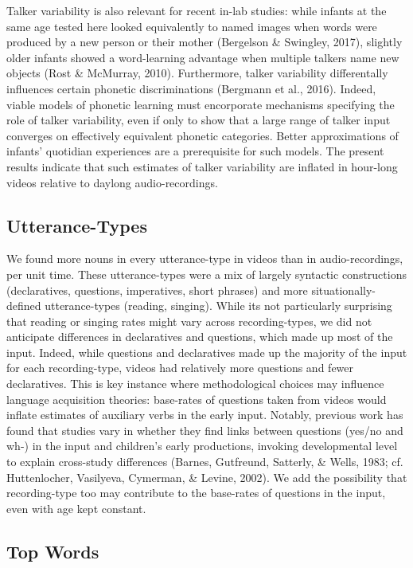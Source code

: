 \documentclass[man]{apa6}
\theoremstyle{definition}
\theoremstyle{definition}
\theoremstyle{definition}
\theoremstyle{remark}
\begin{document}
Talker variability is also relevant for recent in-lab studies: while
infants at the same age tested here looked equivalently to named images
when words were produced by a new person or their mother (Bergelson \&
Swingley, 2017), slightly older infants showed a word-learning advantage
when multiple talkers name new objects (Rost \& McMurray, 2010).
Furthermore, talker variability differentally influences certain
phonetic discriminations (Bergmann et al., 2016). Indeed, viable models
of phonetic learning must encorporate mechanisms specifying the role of
talker variability, even if only to show that a large range of talker
input converges on effectively equivalent phonetic categories. Better
approximations of infants' quotidian experiences are a prerequisite for
such models. The present results indicate that such estimates of talker
variability are inflated in hour-long videos relative to daylong
audio-recordings.

\subsection{Utterance-Types}\label{utterance-types}

We found more nouns in every utterance-type in videos than in
audio-recordings, per unit time. These utterance-types were a mix of
largely syntactic constructions (declaratives, questions, imperatives,
short phrases) and more situationally-defined utterance-types (reading,
singing). While its not particularly surprising that reading or singing
rates might vary across recording-types, we did not anticipate
differences in declaratives and questions, which made up most of the
input. Indeed, while questions and declaratives made up the majority of
the input for each recording-type, videos had relatively more questions
and fewer declaratives. This is key instance where methodological
choices may influence language acquisition theories: base-rates of
questions taken from videos would inflate estimates of auxiliary verbs
in the early input. Notably, previous work has found that studies vary
in whether they find links between questions (yes/no and wh-) in the
input and children's early productions, invoking developmental level to
explain cross-study differences (Barnes, Gutfreund, Satterly, \& Wells,
1983; cf. Huttenlocher, Vasilyeva, Cymerman, \& Levine, 2002). We add
the possibility that recording-type too may contribute to the base-rates
of questions in the input, even with age kept constant.

\subsection{Top Words}\label{top-words}
\end{document}
